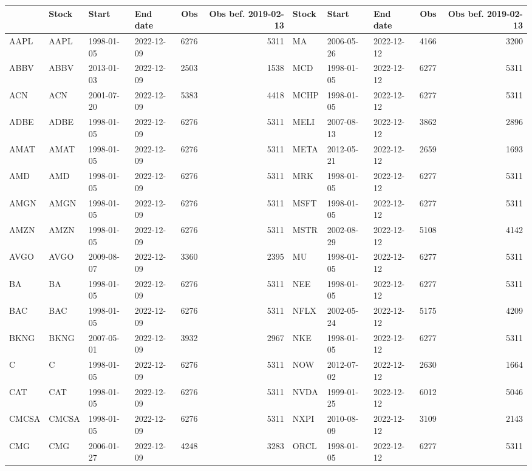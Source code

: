 \begin{table}[ht]
\centering
\begin{tabular}{llllrrlllrr}
  \hline
 & Stock & Start & End date & Obs & Obs bef. 2019-02-13 & Stock & Start & End date & Obs & Obs bef. 2019-02-13 \\ 
  \hline
AAPL & AAPL & 1998-01-05 & 2022-12-09 & 6276 & 5311 & MA & 2006-05-26 & 2022-12-12 & 4166 & 3200 \\ 
  ABBV & ABBV & 2013-01-03 & 2022-12-09 & 2503 & 1538 & MCD & 1998-01-05 & 2022-12-12 & 6277 & 5311 \\ 
  ACN & ACN & 2001-07-20 & 2022-12-09 & 5383 & 4418 & MCHP & 1998-01-05 & 2022-12-12 & 6277 & 5311 \\ 
  ADBE & ADBE & 1998-01-05 & 2022-12-09 & 6276 & 5311 & MELI & 2007-08-13 & 2022-12-12 & 3862 & 2896 \\ 
  AMAT & AMAT & 1998-01-05 & 2022-12-09 & 6276 & 5311 & META & 2012-05-21 & 2022-12-12 & 2659 & 1693 \\ 
  AMD & AMD & 1998-01-05 & 2022-12-09 & 6276 & 5311 & MRK & 1998-01-05 & 2022-12-12 & 6277 & 5311 \\ 
  AMGN & AMGN & 1998-01-05 & 2022-12-09 & 6276 & 5311 & MSFT & 1998-01-05 & 2022-12-12 & 6277 & 5311 \\ 
  AMZN & AMZN & 1998-01-05 & 2022-12-09 & 6276 & 5311 & MSTR & 2002-08-29 & 2022-12-12 & 5108 & 4142 \\ 
  AVGO & AVGO & 2009-08-07 & 2022-12-09 & 3360 & 2395 & MU & 1998-01-05 & 2022-12-12 & 6277 & 5311 \\ 
  BA & BA & 1998-01-05 & 2022-12-09 & 6276 & 5311 & NEE & 1998-01-05 & 2022-12-12 & 6277 & 5311 \\ 
  BAC & BAC & 1998-01-05 & 2022-12-09 & 6276 & 5311 & NFLX & 2002-05-24 & 2022-12-12 & 5175 & 4209 \\ 
  BKNG & BKNG & 2007-05-01 & 2022-12-09 & 3932 & 2967 & NKE & 1998-01-05 & 2022-12-12 & 6277 & 5311 \\ 
  C & C & 1998-01-05 & 2022-12-09 & 6276 & 5311 & NOW & 2012-07-02 & 2022-12-12 & 2630 & 1664 \\ 
  CAT & CAT & 1998-01-05 & 2022-12-09 & 6276 & 5311 & NVDA & 1999-01-25 & 2022-12-12 & 6012 & 5046 \\ 
  CMCSA & CMCSA & 1998-01-05 & 2022-12-09 & 6276 & 5311 & NXPI & 2010-08-09 & 2022-12-12 & 3109 & 2143 \\ 
  CMG & CMG & 2006-01-27 & 2022-12-09 & 4248 & 3283 & ORCL & 1998-01-05 & 2022-12-12 & 6277 & 5311 \\ 

\end{tabular}
\end{table}
